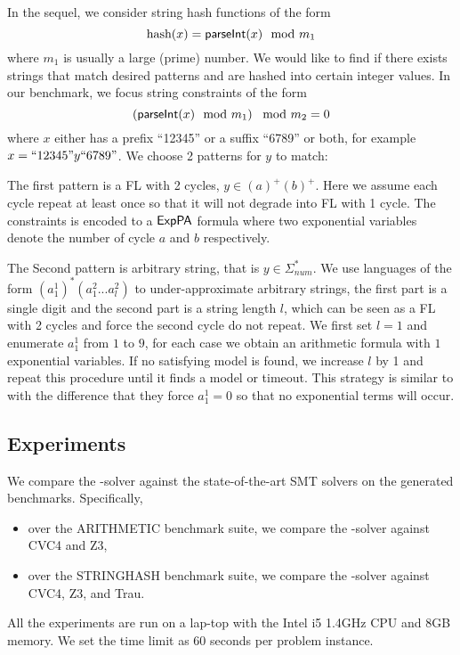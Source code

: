 {%

In the sequel, we consider string hash functions of the form  
\begin{equation}
    \text{hash}(x)= \textsf{parseInt}(x) \mod m_1  \notag
\end{equation}
where $m_1$ is usually a large (prime) number. We would like to find if there exists strings that match desired patterns and are hashed into certain integer values. In our benchmark, we focus string constraints of the form
\begin{equation}
    \left( \textsf{parseInt}(x) \mod m_1\right) \mod m_2 = 0   \notag
\end{equation}
where $x$ either has a prefix ``12345'' or a suffix ``6789'' or both, for example $x=``12345"y``6789"$. We choose 2 patterns for $y$ to match: 

The first pattern is a FL with 2 cycles, $y \in (a)^+(b)^+$. Here we assume each cycle repeat at least once so that it will not degrade into FL with 1 cycle. The constraints is encoded to a ${\sf ExpPA}$ formula where two exponential variables denote the number of cycle $a$ and $b$ respectively.

The Second pattern is arbitrary string, that is $y\in \Sigma_{num}^*$. We use languages of the form $(a^1_1)^* (a^2_1...a^2_l)$ to under-approximate arbitrary strings, the first part is a single digit and the second part is a string length $l$, which can be seen as a FL with 2 cycles and force the second cycle do not repeat. We first set $l=1$ and enumerate $a^1_1$ from $1$ to $9$, for each case we obtain an arithmetic formula with $1$ exponential variables. If no satisfying model is found, we increase $l$ by 1 and repeat this procedure until it finds a model or timeout. This strategy is similar to \cite{Abdulla2020} with the difference that they force $a^1_1=0$ so that no exponential terms will occur.
}

\subsection{Experiments}

We compare the {\paexp}-solver against the state-of-the-art SMT solvers on the generated benchmarks. Specifically, 
\begin{itemize}
\item over the ARITHMETIC benchmark suite, we compare the {\paexp}-solver against CVC4 and Z3,
\item over the STRINGHASH benchmark suite, we compare the {\paexp}-solver against CVC4, Z3, and Trau. 
\end{itemize}
All the experiments are run on a lap-top with the Intel i5 1.4GHz CPU and 8GB memory. We set the time limit as 60 seconds per problem instance. 

